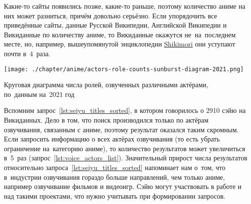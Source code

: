 Какие-то сайты появились позже, какие-то раньше, поэтому количество аниме на них может разниться, причём довольно серьёзно. Если упорядочить все приведённые сайты, данные Русской Википедии, Английской Википедии и Викиданные по количеству аниме, то Викиданные окажутся не~на~последнем месте, но, например, вышеупомянутой энциклопедии \href{https://shikimori.one/}{Shikimori} они уступают почти в~4~раза.



\newpage
\noindent\begin{marginfigure}%
{%
%
    \texttt{[image: ./chapter/anime/actors-role-counts-sunburst-diagram-2021.png]}%
}%
    \caption[Круговая диаграмма числа ролей, озвученных различными сэйю, 2021 год.]
            {Круговая диаграмма числа ролей, озвученных различными актёрами,\\по~данным на~2021 год}%
\label{fig:roles_piechart}%
\end{marginfigure}%
%
Вспомним запрос~\ref{lst:seiyu_titles_sorted}, в котором говорилось о \num{2910} сэйю на Викиданных. 
Дело в том, что поиск производился только по актёрам озвучивания, 
связанным с аниме, поэтому результат оказался таким скромным. 
Если запросить информацию о всех актёрах озвучивания 
(то есть убрать ограничение на~категорию аниме), 
то количество результатов может увеличиться в~5~раз (запрос~\ref{lst:voice_actors_list}). 
Значительный прирост числа результатов относительно запроса~\ref{lst:seiyu_titles_sorted} 
напоминает нам о~том, что в~индустрии озвучивания гораздо больше направлений, 
чем только аниме, например озвучивание фильмов и видеоигр. 
Сэйю могут участвовать в работе и над такими проектами, что нужно учитывать при формировании запросов. 

